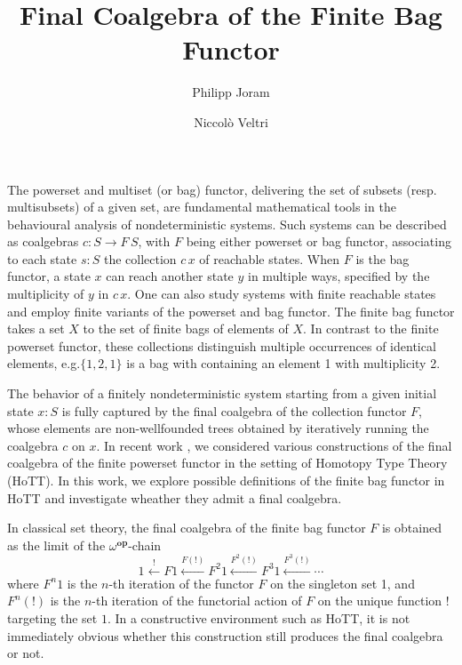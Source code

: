 \documentclass{easychair}
\begin{document}
  \title{Final Coalgebra of the Finite Bag Functor}
  \author{%
      Philipp Joram \and
      Niccol{\`o} Veltri
  }

  \maketitle

  The powerset and multiset (or bag) functor, delivering the set of
  subsets (resp. multisubsets) of a given set, are fundamental
  mathematical tools in the behavioural analysis of nondeterministic
  systems. Such systems can be described as coalgebras $c : S \to
  F\, S$, with $F$ being either powerset or bag functor, associating
  to each state $s : S$ the collection $c \, x$ of reachable
  states. When $F$ is the bag functor, a state $x$ can reach
  another state $y$ in multiple ways, specified by the multiplicity of
  $y$ in $c\,x$. One can also study systems with finite reachable
  states and employ finite variants of the powerset and bag functor.
  The finite bag functor takes a set $X$ to the set of finite
  bags of elements of $X$.  In contrast to the finite powerset
  functor, these collections distinguish multiple occurrences of
  identical elements, e.g.\@ $\{1, 2, 1\}$ is a bag with containing an element
  1 with multiplicity 2.
  
  The behavior of a finitely nondeterministic system starting from a
  given initial state $x : S$ is fully captured by the final coalgebra
  of the collection functor $F$, whose elements are non-wellfounded
  trees obtained by iteratively running the coalgebra $c$ on $x$. In
  recent work \cite{Veltri2021}, we considered various constructions
  of the final coalgebra of the finite powerset functor in the setting
  of Homotopy Type Theory (HoTT). In this work, we explore possible
  definitions of the finite bag functor in HoTT and investigate
  wheather they admit a final coalgebra.

  In classical set theory, the final coalgebra of the finite bag
  functor $F$ is obtained as the limit of the
  $\omega^{\operatorname{\mathbf{op}}}$-chain
  \cite[{Ch. 3.3.13}]{Adamek2021}
  \begin{equation}\label{eq:chain}
    1 \xleftarrow{!} {F 1}
      \xleftarrow{F(!)} {F^2 1}
      \xleftarrow{F^2(!)} {F^3 1}
      \xleftarrow{F^3(!)}
      \cdots
  \end{equation}
  where $F^n 1$ is the $n$-th iteration of the functor $F$ on the
  singleton set 1, and $F^n(!)$ is the $n$-th iteration of the
  functorial action of $F$ on the unique function $!$ targeting the set
  $1$. In a constructive environment such as HoTT, it is not
  immediately obvious whether this construction still produces the
  final coalgebra or not.
\end{document}
